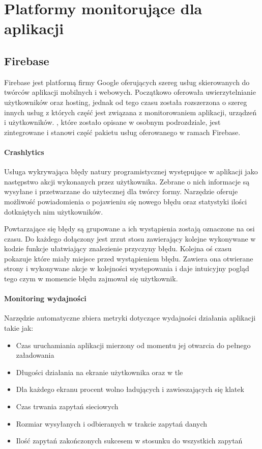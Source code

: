 \section{Platformy monitorujące dla aplikacji}



\subsection{Firebase}
\label{sec:firebase}
Firebase jest platformą firmy Google oferujących szereg usług skierowanych do twórców aplikacji mobilnych i webowych. Początkowo oferowała uwierzytelnianie użytkowników oraz hosting, jednak od tego czasu została rozszerzona o szereg innych usług z których część jest związana z monitorowaniem aplikacji, urządzeń i użytkowników.  , które zostało opisane w osobnym podrozdziale, jest zintegrowane i stanowi część pakietu usług oferowanego w ramach Firebase.

\paragraph{Crashlytics}
Usługa wykrywająca błędy natury programistycznej występujące w aplikacji jako następstwo akcji wykonanych przez użytkownika. Zebrane o nich informacje są wysyłane i przetwarzane do użytecznej dla twórcy formy. Narzędzie oferuje możliwość powiadomienia o pojawieniu się nowego błędu oraz statystyki ilości dotkniętych nim użytkowników.

Powtarzające się błędy są grupowane a ich wystąpienia zostają oznaczone na osi czasu. Do każdego dołączony jest zrzut stosu zawierający kolejne wykonywane w kodzie funkcje ułatwiający znalezienie przyczyny błędu. Kolejna oś czasu pokazuje {\it {}} które miały miejsce przed wystąpieniem błędu. Zawiera ona otwierane strony i wykonywane akcje w kolejności występowania i daje intuicyjny pogląd tego czym w momencie błędu zajmował się użytkownik. 

\paragraph{Monitoring wydajności}
Narzędzie automatyczne zbiera metryki dotyczące wydajności działania aplikacji takie jak:
\begin{itemize}
	\item Czas uruchamiania aplikacji mierzony od momentu jej otwarcia do pełnego załadowania
	\item Długości działania na ekranie użytkownika oraz w tle
	\item Dla każdego ekranu procent wolno ładujących i zawieszających się klatek
	\item Czas trwania zapytań sieciowych
	\item Rozmiar wysyłanych i odbieranych w trakcie zapytań danych
	\item Ilość zapytań zakończonych sukcesem w stosunku do wszystkich zapytań
\end{itemize}
\bigskip

